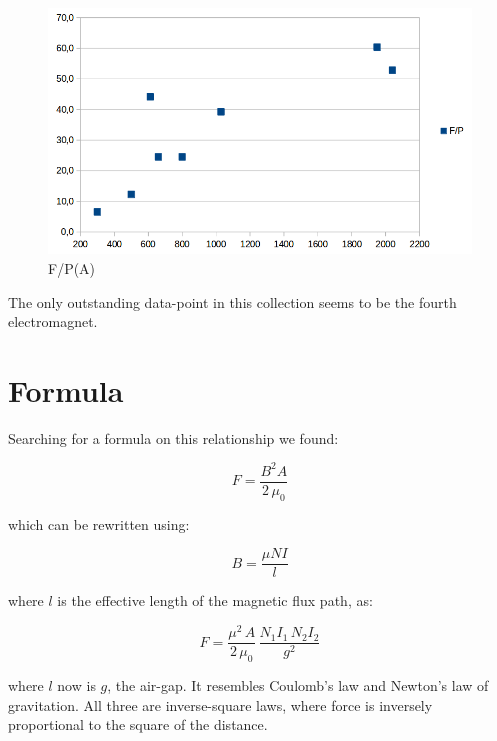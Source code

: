 \documentclass[]{../common/elementary-physics}
\begin{document}
\begin{figure}[ht] \centering
	\includegraphics[scale=.4]{fp-of-a-2} \caption{F/P(A)}
\end{figure}

The only outstanding data-point in this collection seems to be the fourth electromagnet.


\section{Formula}

Searching for a formula on this relationship we found\cite{wpele,gbet}:

\begin{equation}
F = \frac{B^2 A}{2 \, \mu_0}
\end{equation}

which can be rewritten using:

\begin{equation}
B = \frac{\mu N I}{l}
\end{equation}

where $l$ is the effective length of the magnetic flux path, as\cite{wpele}:

\begin{equation}
F = \frac{\mu^2 \, A}{2 \, \mu_0} \, \frac{N_1 I_1 \, N_2 I_2}{g^2}
\end{equation}

where $l$ now is $g$, the air-gap.
It resembles Coulomb's law and Newton's law of gravitation.
All three are inverse-square laws, where force is inversely proportional to the square of the distance.
\end{document}
